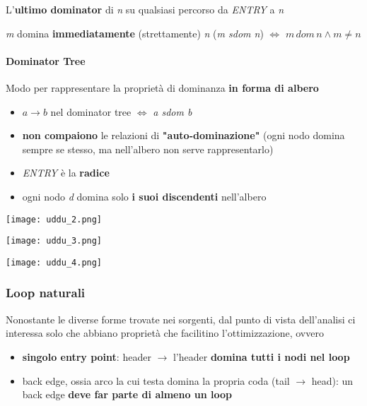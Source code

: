 L'\textbf{ultimo dominator} di \textit{n} su qualsiasi percorso da \textit{ENTRY} a \textit{n}

\textit{m} domina \textbf{immediatamente} (strettamente) \textit{n} (\textit{m sdom n}) $\iff$ $m\, dom \,n\land m \neq n$

\paragraph{Dominator Tree}

Modo per rappresentare la propriet\`a di dominanza \textbf{in forma di albero}

\begin{itemize}
  \item $a \rightarrow b$ nel dominator tree $\iff$ \textit{a sdom b}
  \item \textbf{non compaiono} le relazioni di \textbf{"auto-dominazione"} (ogni nodo domina sempre se stesso, ma nell'albero non serve rappresentarlo)
  \newpage
  \item \textit{ENTRY} \`e la \textbf{radice}
  \item ogni nodo \textit{d} domina solo \textbf{i suoi discendenti} nell'albero
\end{itemize}

\begin{example}[frametitle={Esempi di DT}]
  \begin{minipage}[c]{.24\textwidth}
    \texttt{[image: uddu\_2.png]}
  \end{minipage}
  \begin{minipage}[c]{.24\textwidth}
    \texttt{[image: uddu\_3.png]}
  \end{minipage}\hfill\vline\hfill
  \begin{minipage}[c]{.48\textwidth}
    \texttt{[image: uddu\_4.png]}
    \label{example-dt}
  \end{minipage}
\end{example}


\subsubsection{Loop naturali}

Nonostante le diverse forme trovate nei sorgenti, dal punto di vista dell'analisi ci interessa solo che abbiano propriet\`a che facilitino l'ottimizzazione, ovvero
\begin{itemize}
  \item \textbf{singolo entry point}: header $\rightarrow$ l'header \textbf{domina tutti i nodi nel loop}
  \item back edge, ossia arco la cui testa domina la propria coda (tail $\rightarrow$ head): un back edge \textbf{deve far parte di almeno un loop}
\end{itemize}

